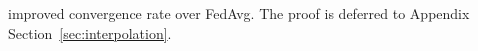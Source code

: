 improved convergence rate over FedAvg. The proof is deferred to Appendix Section~\ref{sec:interpolation}.
\begin{comment}
we deal with the question of whether FedAvg with momentum-based
local updates can outperform FedAvg with SGD updates. In contrast
to the gradient descent setting, Nesterov and Heavy Ball updates are
known to fail to accelerate over SGD, both in the overparameterized
setting and standard convex setting \cite{liu2018accelerating,kidambi2018insufficiency,liu2018toward,yuan2016influence}.
Thus in general one cannot hope to obtain acceleration results for
the FedAvg algorithm with Nesterov and Heavy Ball updates. On the
hopeful side, \cite{jain2017accelerating,liu2018accelerating} introduced
similar algorithms that make modifications of the Nesterov updates
to correct for its ``over-descent''. For quadratic objectives in
the overparamterized setting, \cite{liu2018accelerating} show their
algorithm achieves acceleration over the geometric convergence of
SGD that recovers the well-known $\mathcal{O}(\exp(-t/\sqrt{\kappa})$
acceleration of Nesterov over GD. In the last part, we introduce a
new accelerated FedAvg algorithm by adapting the MaSS algorithm of
\cite{liu2018accelerating} to the federated learning setting. We
show that it achieves geometric convergence for overparameterized
quadratic problems with rate $\mathcal{O}(\exp(-\frac{NT}{E\sqrt{\kappa_{1}\tilde{\kappa}}}))$,
where $\tilde{\kappa}$ is a ``statistical condition number''\cite{liu2018accelerating,jain2017accelerating}
that satisfies $\tilde{\kappa}\leq\kappa_{1}$. Thus our new FedAvg
algorithm achieves a speedup of factor $\sqrt{\kappa_{1}/\tilde{\kappa}}$
over FedAvg with local SGD updates. 
\end{comment}


